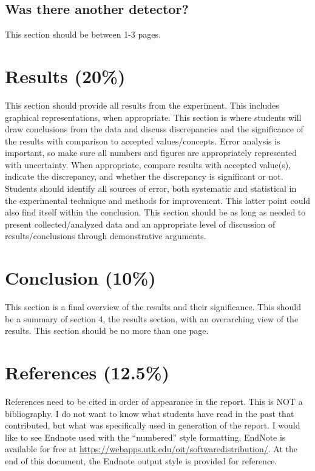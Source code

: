 \documentclass[12pt]{article}
\begin{document}
\subsection{Was there another detector?}

This section should be between 1-3 pages.

\section{Results (20\%)}
This section should provide all results from the experiment. This includes graphical representations, when appropriate. This section is where students will draw conclusions from the data and discuss discrepancies and the significance of the results with comparison to accepted values/concepts. Error analysis is important, so make sure all numbers and figures are appropriately represented with uncertainty. When appropriate, compare results with accepted value(s), indicate the discrepancy, and whether the discrepancy is significant or not. Students should identify all sources of error, both systematic and statistical in the experimental technique and methods for improvement. This latter point could also find itself within the conclusion. This section should be as long as needed to present collected/analyzed data and an appropriate level of discussion of results/conclusions through demonstrative arguments.

\section{Conclusion (10\%)}
This section is a final overview of the results and their significance. This should be a summary of section 4, the results section, with an overarching view of the results. This section should be no more than one page.

\section{References (12.5\%)}
References need to be cited in order of appearance in the report. This is NOT a bibliography. I do not want to know what students have read in the past that contributed, but what was specifically used in generation of the report. I would like to see Endnote used with the “numbered” style formatting. EndNote is available for free at \url{https://webapps.utk.edu/oit/softwaredistribution/}. At the end of this document, the Endnote output style is provided for reference.
\end{document}
